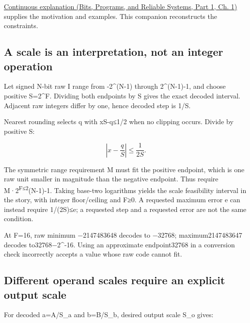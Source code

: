 \href{../01-Bits-Programs-and-Reliable-Systems-P01/main.pdf\#nameddest=01-foundations-i-ch001-choosing-what-information-to-keep}{Continuous explanation (Bits, Programs, and Reliable Systems, Part 1, Ch. 1)} supplies the motivation and examples. This companion reconstructs the constraints.

\subsection{A scale is an interpretation, not an integer operation}\label{03-visual-computing-i-ch018-a-scale-is-an-interpretation-not-an-integer-operation}

\hypertarget{03-visual-computing-i-ch018-a-scale-is-an-interpretation-not-an-integer-operation}{}

Let signed N-bit raw I range from -2\^{}(N-1) through 2\^{}(N-1)-1, and choose positive S=2\^{}F. Dividing both endpoints by S gives the exact decoded interval. Adjacent raw integers differ by one, hence decoded step is 1/S.

Nearest rounding selects q with \textbar xS-q\textbar≤1/2 when no clipping occurs. Divide by positive S:

\[
\left|x-\frac qS\right|\le\frac1{2S}.
\]

The symmetric range requirement M must fit the positive endpoint, which is one raw unit smaller in magnitude than the negative endpoint. Thus require M·2\textsuperscript{F≤2}(N-1)-1. Taking base-two logarithms yields the scale feasibility interval in the story, with integer floor/ceiling and F≥0. A requested maximum error e can instead require 1/(2S)≤e; a requested step and a requested error are not the same condition.

At F=16, raw minimum −2147483648 decodes to −32768; maximum2147483647 decodes to32768−2\^{}-16. Using an approximate endpoint32768 in a conversion check incorrectly accepts a value whose raw code cannot fit.

\subsection{Different operand scales require an explicit output scale}\label{03-visual-computing-i-ch018-different-operand-scales-require-an-explicit-output-scale}

\hypertarget{03-visual-computing-i-ch018-different-operand-scales-require-an-explicit-output-scale}{}

For decoded a=A/S\_a and b=B/S\_b, desired output scale S\_o gives:

